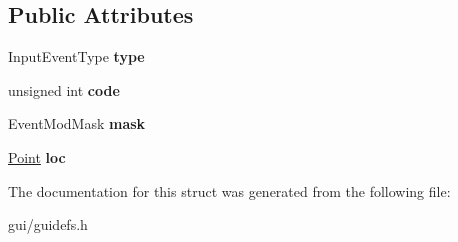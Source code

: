\subsection*{Public Attributes}
\begin{DoxyCompactItemize}
\item 
Input\+Event\+Type {\bfseries type}\hypertarget{structInputEvent_a3a252efa580d9727fc0ca5025559eaec}{}\label{structInputEvent_a3a252efa580d9727fc0ca5025559eaec}

\item 
unsigned int {\bfseries code}\hypertarget{structInputEvent_af37559bdca25fd82c1aeee2893ab89c9}{}\label{structInputEvent_af37559bdca25fd82c1aeee2893ab89c9}

\item 
Event\+Mod\+Mask {\bfseries mask}\hypertarget{structInputEvent_a5ea1b6dbcd1dbca350cdd65000a9ead1}{}\label{structInputEvent_a5ea1b6dbcd1dbca350cdd65000a9ead1}

\item 
\hyperlink{classPoint}{Point} {\bfseries loc}\hypertarget{structInputEvent_a22616274fbf9515103f126720905bf2c}{}\label{structInputEvent_a22616274fbf9515103f126720905bf2c}

\end{DoxyCompactItemize}


The documentation for this struct was generated from the following file\+:\begin{DoxyCompactItemize}
\item 
gui/guidefs.\+h\end{DoxyCompactItemize}
